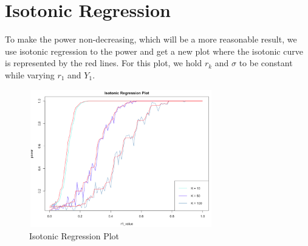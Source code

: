 \documentclass[10pt,english]{article}\usepackage{graphicx, color}
\numberwithin{equation}{section}
\numberwithin{figure}{section}
\begin{document}
\section{Isotonic Regression}
To make the power non-decreasing, which will be a more reasonable result, we use isotonic regression to the power and get a new plot where the isotonic curve is represented by the red lines. For this plot, we hold $r_k$ and $\sigma$ to be constant while varying $r_1$ and $Y_1$.\\
\begin{figure}[htbp]
\centering\includegraphics[width=8cm, height=6cm]{iso}
\caption{Isotonic Regression Plot}
\end{figure}
\quad\\
\quad\\


\quad\\
\quad\\
\end{document}
